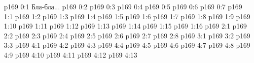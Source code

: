 \author{Промежуточные создания}
\vs p169 0:1  Бла-бла...
\vs p169 0:2 
\vs p169 0:3 \pc 
\vs p169 0:4 
\vs p169 0:5 
\vs p169 0:6 
\vs p169 0:7 
\vs p169 1:1 
\vs p169 1:2 \pc 
\vs p169 1:3 
\vs p169 1:4 
\vs p169 1:5 
\vs p169 1:6 \pc 
\vs p169 1:7 
\vs p169 1:8 
\vs p169 1:9 
\vs p169 1:10 
\vs p169 1:11 
\vs p169 1:12 
\vs p169 1:13 
\vs p169 1:14 \pc 
\vs p169 1:15 
\vs p169 1:16 
\vs p169 2:1 
\vs p169 2:2 \pc 
\vs p169 2:3 
\vs p169 2:4 
\vs p169 2:5 
\vs p169 2:6 
\vs p169 2:7 
\vs p169 2:8 \pc 
{}
\vs p169 3:1 
\vs p169 3:2 
\vs p169 3:3 
\vs p169 4:1 
\vs p169 4:2 
\vs p169 4:3 \pc 
\vs p169 4:4 
\vs p169 4:5 \pc 
\vs p169 4:6 
\vs p169 4:7 
\vs p169 4:8 
\vs p169 4:9 
\vs p169 4:10 
\vs p169 4:11 \pc 
\vs p169 4:12 
\vs p169 4:13 
\quizlink
